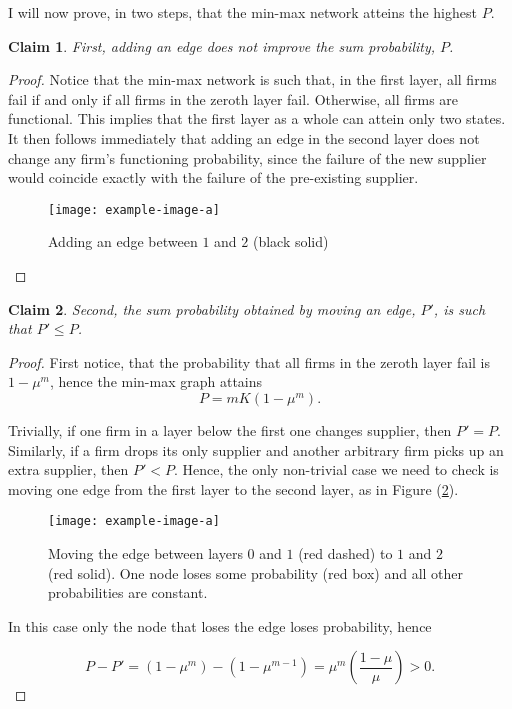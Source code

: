 \documentclass[american, abstract=on]{scrartcl}
\newcommand{\inputTikZ}[2]{\scalebox{#1}{}}
\theoremstyle{plain}
\newtheorem{claim}{Claim}
\begin{document}
I will now prove, in two steps, that the min-max network atteins the highest $P$.

\begin{claim} \label{claim:min-max:first}
    First, adding an edge does not improve the sum probability, $P$. \end{claim} \begin{proof}
    Notice that the min-max network is such that, in the first layer, all firms fail if and only if all firms in the zeroth layer fail. Otherwise, all firms are functional. This implies that the first layer as a whole can attein only two states. It then follows immediately that adding an edge in the second layer does not change any firm's functioning probability, since the failure of the new supplier would coincide exactly with the failure of the pre-existing supplier.

    \begin{figure}[H]
        \centering
        \texttt{[image: example-image-a]}
        \caption{Adding an edge between $1$ and $2$ (black solid)} \label{fig:adding-an-edge}
    \end{figure}


\end{proof}

\begin{claim} \label{claim:min-max:second}
    Second, the sum probability obtained by moving an edge, $P'$, is such that $P' \leq P$.
\end{claim}
\begin{proof}
    First notice, that the probability that all firms in the zeroth layer fail is $1 - \mu^m$, hence the min-max graph attains
    \begin{equation}
        P = m K (1 - \mu^{m}).
    \end{equation}

    Trivially, if one firm in a layer below the first one changes supplier, then $P' = P$. Similarly, if a firm drops its only supplier and another arbitrary firm picks up an extra supplier, then $P' < P$. Hence, the only non-trivial case we need to check is moving one edge from the first layer to the second layer, as in Figure (\ref{fig:min-max-moving-edge}).

    \begin{figure}[H]
        \centering
        \texttt{[image: example-image-a]}
        \caption{Moving the edge between layers $0$ and $1$ (red dashed) to $1$ and $2$ (red solid). One node loses some probability (red box) and all other probabilities are constant.} \label{fig:min-max-moving-edge}
    \end{figure}

    In this case only the node that loses the edge loses probability, hence

    \begin{equation}
        P - P' = (1 - \mu^m) - (1 - \mu^{m-1}) = \mu^m \left(\frac{1 - \mu}{\mu}\right) > 0.
    \end{equation}
\end{proof}
\end{document}

